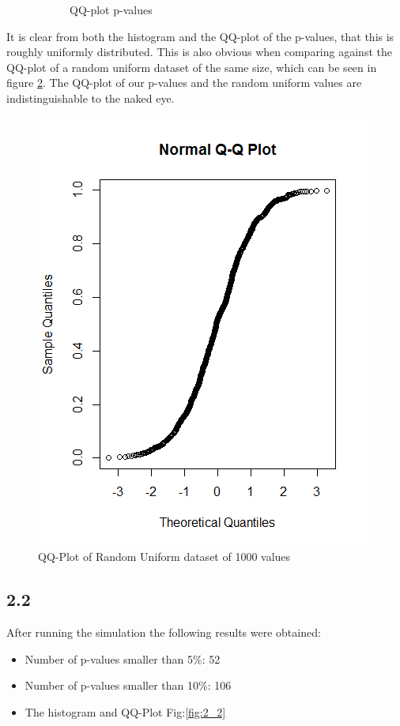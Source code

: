 \documentclass{article}
\begin{document}
\begin{figure}[!htb]
\begin{subfigure}{.5\textwidth}
        \caption{QQ-plot p-values}
        \end{subfigure}
        \caption{}
        \label{fig:2_1}
      \end{figure}
      
      It is clear from both the histogram and the QQ-plot of the p-values, that this is roughly uniformly distributed. This is also obvious when comparing against the QQ-plot of a random uniform dataset of the same size, which can be seen in figure \ref{fig:2_uniform}. The QQ-plot of our p-values and the random uniform values are indistinguishable to the naked eye.
      
      \begin{figure}[!htb]
      \centering
      \includegraphics[scale=0.5]{results/2_discussion}
      \caption{QQ-Plot of Random Uniform dataset of 1000 values}
      \label{fig:2_uniform}
      \end{figure}

    \subsection{2.2}
      After running the simulation the following results were obtained:
      \begin{itemize}
        \item Number of p-values smaller than 5\%: 52
        \item Number of p-values smaller than 10\%: 106
        \item The histogram and QQ-Plot Fig:\ref{fig:2_2}
      \end{itemize}
      
\end{document}
